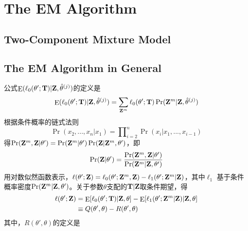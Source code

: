     \section{The EM Algorithm}
        \subsection{Two-Component Mixture Model}
        \subsection{The EM Algorithm in General}
            公式${\mathop{\rm E}\nolimits} ({\ell _0}(\theta ';{\bf{T}})|{\bf{Z}},{\hat \theta ^{(j)}})$的定义是
            \begin{equation}
                {\mathop{\rm E}\nolimits} ({\ell _0}(\theta ';{\bf{T}})|{\bf{Z}},{\hat \theta ^{(j)}}) = \sum\limits_{{{\bf{Z}}^m}} {{\ell _0}(\theta ';{\bf{T}})} \Pr ({{\bf{Z}}^m}|{\bf{Z}},{\hat \theta ^{(j)}})
            \end{equation}
            根据条件概率的链式法则
            \begin{equation}
              \Pr ({x_2},...,{x_n}|{x_1}) = \prod\nolimits_{i = 2}^n {\Pr ({x_i}|{x_1},...,{x_{i - 1}})}
            \end{equation}
            得$\Pr ({{\bf{Z}}^m},{\bf{Z}}|\theta ') = \Pr({{\bf{Z}}^m}|\theta ')\Pr({\bf{Z}}|{{\bf{Z}}^m},\theta ')$，即
            \begin{equation}
              \Pr ({\bf{Z}}|\theta ') = \frac{{\Pr ({{\bf{Z}}^m},{\bf{Z}}|\theta ')}}{{\Pr ({{\bf{Z}}^m}|{\bf{Z}},\theta ')}}
            \end{equation}
            用对数似然函数表示，$\ell (\theta ';{\bf{Z}}) = {\ell _0}(\theta ';{{\bf{Z}}^m},{\bf{Z}}) - {\ell _1}(\theta ';{{\bf{Z}}^m}|{\bf{Z}})$，其中${\ell _1}$ 基于条件概率密度$\Pr ({{\bf{Z}}^m}|{\bf{Z}},\theta ')$。关于参数$\theta$支配的${\bf{T}}|{\bf{Z}}$取条件期望，得
            \begin{equation}
              \begin{aligned}
                \ell (\theta ';{\bf{Z}}) &= {\mathop{\rm E}\nolimits} [{\ell _0}(\theta ';{\bf{T}})|{\bf{Z}},\theta ] - {\mathop{\rm E}\nolimits} [{\ell _1}(\theta ';{{\bf{Z}}^m}|{\bf{Z}})|{\bf{Z}},\theta ]\\
                 &\equiv Q(\theta ',\theta ) - R(\theta ',\theta )
              \end{aligned}
            \end{equation}
            其中，$R(\theta ',\theta )$的定义是
